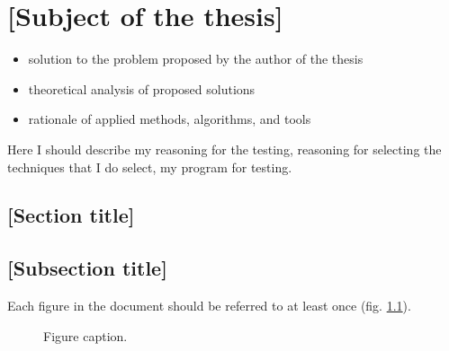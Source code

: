 \chapter{[Subject of the thesis]}

\begin{itemize}
\item solution to the problem proposed by the author of the thesis
\item theoretical analysis of proposed solutions
\item rationale of applied methods, algorithms, and tools
\end{itemize}

Here I should describe my reasoning for the testing, reasoning for
selecting the techniques that I do select, my program for testing.

\section{[Section title]}

\section{[Subsection title]}

Each figure in the document should be referred to at least once (fig. \ref{fig:2}).

\begin{figure}
\centering
{}
\caption{Figure caption.} %
\label{fig:2}
\end{figure}


